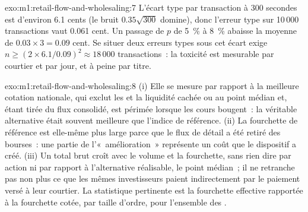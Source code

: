 \begin{solution}{exo:m1:retail-flow-and-wholesaling:7}
L'écart type par transaction à 300 secondes est d'environ 6.1 cents (le
bruit $0.35\sqrt{300}$ domine), donc l'erreur type sur 10\,000 transactions
vaut 0.061 cent. Un passage de $p$ de 5~\% à 8~\% abaisse la moyenne de $0.03 \times 3 =
0.09$ cent. Se situer deux erreurs types sous cet écart exige $n \ge
(2\times6.1/0.09)^2 \approx 18\,000$ transactions~: la toxicité est mesurable par
courtier et par jour, et à peine par titre.
\end{solution}

\begin{solution}{exo:m1:retail-flow-and-wholesaling:8}
(i) Elle se mesure par rapport à la meilleure cotation nationale, qui exclut les  et la liquidité cachée ou au point médian et, étant tirée du flux consolidé,
est périmée lorsque les cours bougent~: la véritable alternative était souvent meilleure que
l'indice de référence. (ii) La fourchette de référence est elle-même plus large parce que le flux de détail a
été retiré des bourses~: une partie de l'«~amélioration~» représente un coût que
le dispositif a créé. (iii) Un total brut croît avec le volume et la fourchette, sans
rien dire par action ni par rapport à l'alternative réalisable, le
point médian~; il ne retranche pas non plus ce que les mêmes investisseurs paient indirectement par
le paiement versé à leur courtier. La statistique pertinente est la fourchette effective
rapportée à la fourchette cotée, par taille d'ordre, pour l'ensemble des .
\end{solution}

